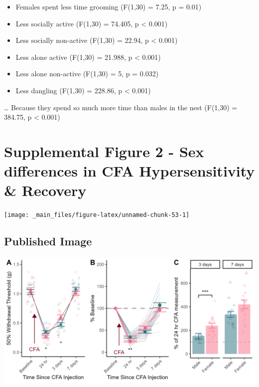 \documentclass[
]{book}
\providecommand{\tightlist}{%
  \setlength{\itemsep}{0pt}\setlength{\parskip}{0pt}}
\begin{document}
\begin{itemize}
\tightlist
\item
  Females spent less time grooming (F(1,30) = 7.25, p = 0.01)
\item
  Less socially active (F(1,30) = 74.405, p \textless{} 0.001)
\item
  Less socially non-active (F(1,30) = 22.94, p \textless{} 0.001)
\item
  Less alone active (F(1,30) = 21.988, p \textless{} 0.001)
\item
  Less alone non-active (F(1,30) = 5, p = 0.032)
\item
  Less dangling (F(1,30) = 228.86, p \textless{} 0.001)
\end{itemize}

\ldots{} Because they spend so much more time than males in the nest (F(1,30) = 384.75, p \textless{} 0.001)

\hypertarget{supplemental-figure-2---sex-differences-in-cfa-hypersensitivity-recovery}{%
\chapter*{Supplemental Figure 2 - Sex differences in CFA Hypersensitivity \& Recovery}\label{supplemental-figure-2---sex-differences-in-cfa-hypersensitivity-recovery}}

\begin{center}\texttt{[image: \_main\_files/figure-latex/unnamed-chunk-53-1]} \end{center}

\hypertarget{published-image-6}{%
\section*{Published Image}\label{published-image-6}}

\begin{center}\includegraphics[width=29.17in]{Figs/S2_MvF_CFA} \end{center}
\end{document}
